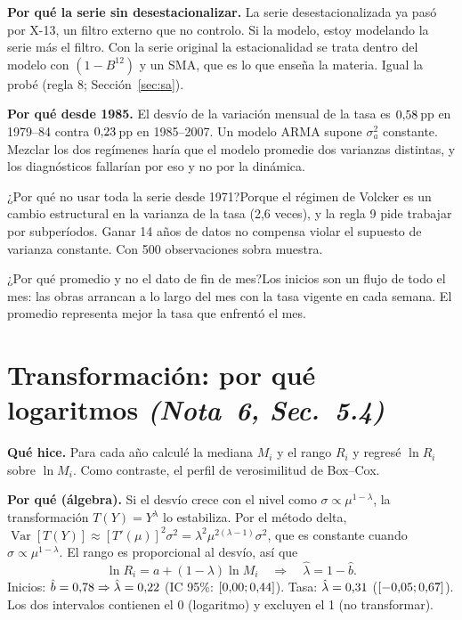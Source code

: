 \documentclass[11pt,a4paper]{article}
\newcommand{\nota}[2]{\textit{(Nota~#1, Sec.~#2)}}
\newcommand{\Q}[2]{\begin{pregunta}{#1}#2\end{pregunta}}
\begin{document}
\textbf{Por qu\'e la serie sin desestacionalizar.} La serie desestacionalizada ya pas\'o por X-13, un filtro externo que no controlo. Si la modelo, estoy modelando la serie m\'as el filtro. Con la serie original la estacionalidad se trata dentro del modelo con $(1-B^{12})$ y un SMA, que es lo que ense\~na la materia. Igual la prob\'e (regla 8; Secci\'on~\ref{sec:sa}).

\textbf{Por qu\'e desde 1985.} El desv\'io de la variaci\'on mensual de la tasa es $0{,}58$\,pp en 1979--84 contra $0{,}23$\,pp en 1985--2007. Un modelo ARMA supone $\sigma^2_a$ constante. Mezclar los dos reg\'imenes har\'ia que el modelo promedie dos varianzas distintas, y los diagn\'osticos fallar\'ian por eso y no por la din\'amica.

\Q{¿Por qu\'e no usar toda la serie desde 1971?}{Porque el r\'egimen de Volcker es un cambio estructural en la varianza de la tasa (2,6 veces), y la regla 9 pide trabajar por subper\'iodos. Ganar 14 a\~nos de datos no compensa violar el supuesto de varianza constante. Con 500 observaciones sobra muestra.}

\Q{¿Por qu\'e promedio y no el dato de fin de mes?}{Los inicios son un flujo de todo el mes: las obras arrancan a lo largo del mes con la tasa vigente en cada semana. El promedio representa mejor la tasa que enfrent\'o el mes.}

\section{Transformaci\'on: por qu\'e logaritmos \nota{6}{5.4}}
\textbf{Qu\'e hice.} Para cada a\~no calcul\'e la mediana $M_i$ y el rango $R_i$ y regres\'e $\ln R_i$ sobre $\ln M_i$. Como contraste, el perfil de verosimilitud de Box--Cox.

\textbf{Por qu\'e (\'algebra).} Si el desv\'io crece con el nivel como $\sigma\propto\mu^{1-\lambda}$, la transformaci\'on $T(Y)=Y^\lambda$ lo estabiliza. Por el m\'etodo delta, $\operatorname{Var}[T(Y)]\approx[T'(\mu)]^2\sigma^2=\lambda^2\mu^{2(\lambda-1)}\sigma^2$, que es constante cuando $\sigma\propto\mu^{1-\lambda}$. El rango es proporcional al desv\'io, as\'i que
\[
\ln R_i = a + (1-\lambda)\ln M_i \quad\Longrightarrow\quad \hat\lambda = 1-\hat b .
\]
Inicios: $\hat b=0{,}78\Rightarrow\hat\lambda=0{,}22$ (IC 95\%: $[0{,}00;0{,}44]$). Tasa: $\hat\lambda=0{,}31$ ($[-0{,}05;0{,}67]$). Los dos intervalos contienen el 0 (logaritmo) y excluyen el 1 (no transformar).
\end{document}
